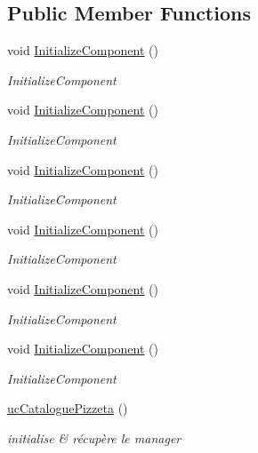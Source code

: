 \subsection*{Public Member Functions}
\begin{DoxyCompactItemize}
\item 
void \hyperlink{classnewPizza1_1_1ucCataloguePizzeta_afdbc12c0fdebf3e506da6fe56e30af7b}{Initialize\+Component} ()
\begin{DoxyCompactList}\small\item\em Initialize\+Component \end{DoxyCompactList}\item 
void \hyperlink{classnewPizza1_1_1ucCataloguePizzeta_afdbc12c0fdebf3e506da6fe56e30af7b}{Initialize\+Component} ()
\begin{DoxyCompactList}\small\item\em Initialize\+Component \end{DoxyCompactList}\item 
void \hyperlink{classnewPizza1_1_1ucCataloguePizzeta_afdbc12c0fdebf3e506da6fe56e30af7b}{Initialize\+Component} ()
\begin{DoxyCompactList}\small\item\em Initialize\+Component \end{DoxyCompactList}\item 
void \hyperlink{classnewPizza1_1_1ucCataloguePizzeta_afdbc12c0fdebf3e506da6fe56e30af7b}{Initialize\+Component} ()
\begin{DoxyCompactList}\small\item\em Initialize\+Component \end{DoxyCompactList}\item 
void \hyperlink{classnewPizza1_1_1ucCataloguePizzeta_afdbc12c0fdebf3e506da6fe56e30af7b}{Initialize\+Component} ()
\begin{DoxyCompactList}\small\item\em Initialize\+Component \end{DoxyCompactList}\item 
void \hyperlink{classnewPizza1_1_1ucCataloguePizzeta_afdbc12c0fdebf3e506da6fe56e30af7b}{Initialize\+Component} ()
\begin{DoxyCompactList}\small\item\em Initialize\+Component \end{DoxyCompactList}\item 
\hyperlink{classnewPizza1_1_1ucCataloguePizzeta_ab0b46b46a34b1dc6f4c04db58a8c2df7}{uc\+Catalogue\+Pizzeta} ()
\begin{DoxyCompactList}\small\item\em initialise \& récupère le manager \end{DoxyCompactList}\end{DoxyCompactItemize}

